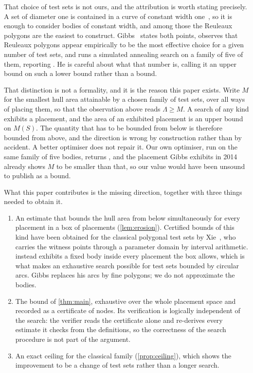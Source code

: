 \documentclass[a4paper,UKenglish,cleveref,autoref,thm-restate,numberwithinsect]{lipics-v2021}
\begin{document}
That choice of test sets is not ours, and the attribution is worth stating
precisely.
A set of diameter one is contained in a curve of constant width
one~\cite{Grunbaum1963}, so it is enough to consider bodies of constant width,
and among those the Reuleaux polygons are the easiest to construct.
Gibbs~\cite{Gibbs2014} states both points, observes that Reuleaux polygons appear
empirically to be the most effective choice for a given number of test sets, and
runs a simulated annealing search on a family of five of them, reporting
\GibbsHeuristic{}. He is careful about what that number is, calling it an upper
bound on such a lower bound rather than a bound.

That distinction is not a formality, and it is the reason this paper exists.
Write $M$ for the smallest hull area attainable by a chosen family of test sets,
over all ways of placing them, so that the observation above reads
$\Lambda\ge M$. A search of any kind
exhibits a placement, and the area of an exhibited placement is an upper bound on
$M(S)$. The quantity that has to be bounded from below is therefore bounded from
above, and the direction is wrong by construction rather than by accident. A
better optimiser does not repair it. Our own optimiser, run on the same family of
five bodies, returns \GibbsOursOnHis{}, and the placement Gibbs exhibits in 2014
already shows $M$ to be smaller than that, so our value would have been
unsound to publish as a bound.

What this paper contributes is the missing direction, together with three things
needed to obtain it.

\begin{enumerate}
\item An estimate that bounds the hull area from below simultaneously for every
      placement in a box of placements (\cref{lem:erosion}). Certified bounds of
      this kind have been obtained for the classical polygonal test sets by
      Xie~\cite{Xie2026}, who carries the witness points through a parameter
      domain by interval arithmetic.  instead exhibits a fixed
      body inside every placement the box allows, which is what makes an
      exhaustive search possible for test sets bounded by circular arcs. Gibbs
      replaces his arcs by fine polygons; we do not approximate the bodies.
\item The bound of \cref{thm:main}, exhaustive over the whole placement space and
      recorded as a certificate of \Nodes{} nodes. Its verification is logically
      independent of the search: the verifier reads the certificate alone and
      re-derives every estimate it checks from the definitions, so the
      correctness of the search procedure is not part of the argument.
\item An exact ceiling for the classical family (\cref{prop:ceiling}), which
      shows the improvement to be a change of test sets rather than a longer
      search.
\end{enumerate}
\end{document}
